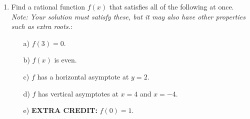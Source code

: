 \documentclass[letterpaper,11pt]{article}
\newif\ifsolutions
\begin{document}
\begin{enumerate}
\item Find a rational function $f(x)$ that satisfies all of the following at once. \textit{Note: Your solution must satisfy these, but it may also have other properties such as extra roots.}:
\begin{enumerate}
    \item[a)] $f(3) = 0$.
    \item[b)] $f(x)$ is even.
    \item[c)] $f$ has a horizontal asymptote at $y=2$.
    \item[d)] $f$ has vertical asymptotes at $x=4$ and $x=-4$.
    \item[e)] \textbf{EXTRA CREDIT: }$f(0)=1$.
\end{enumerate}
\end{enumerate}
\ifsolutions \color{blue} $f(x) = 2\frac{(x-3)(x+3)}{(x-4)(x+4)}$ for a-d. $f(x) = 2\frac{(x^2-9)(x^2+1/18)}{(x^2-16)(x^2+1/16)}$ for a-e. \fi
\end{document}
